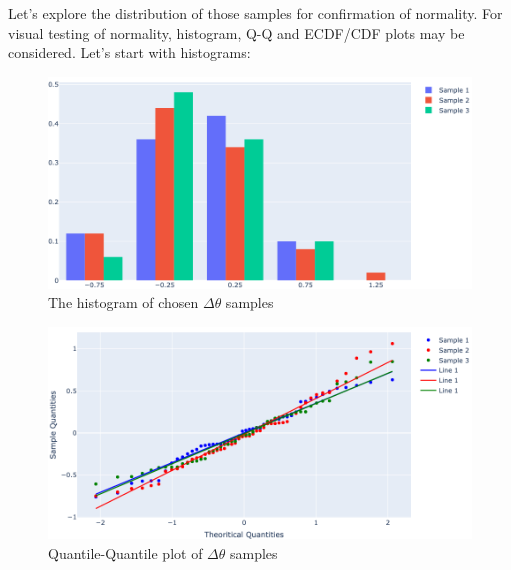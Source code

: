 \documentclass[
  digital, %
  oneside, %
  lof,     %
  lot,     %
]{fithesis4}
\begin{document}
Let's explore the distribution of those samples 
for confirmation of normality. 
For visual testing of normality, histogram, 
Q-Q and ECDF/CDF plots may be considered. 
Let's start with histograms:

\begin{figure}[h]
  \begin{center}
    \includegraphics[width=\textwidth]{images/theta-diff-histogram.png}
  \end{center}
  \caption{The histogram of chosen $\Delta \theta$ samples}
  \label{fig:theta-diff-histogram}
\end{figure}

\begin{figure}[h]
  \begin{center}
    \includegraphics[width=\textwidth]{images/theta-diff-qq.png}
  \end{center}
  \caption{Quantile-Quantile plot of $\Delta \theta$ samples}
  \label{fig:theta-diff-qq}
\end{figure}
\end{document}
